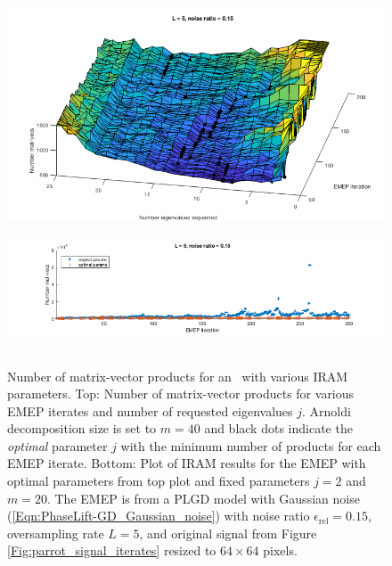 \begin{figure}[H]
\centering
\hbox{\hspace{-0.8cm} \includegraphics[scale=0.6]{Numerics-num_matvecs_orig_vs_optimal_params_1} }\vspace{1.0cm}
\hbox{\hspace{-1.6cm} \includegraphics[scale=0.6]{Numerics-num_matvecs_orig_vs_optimal_params_2} }\vspace{0.0cm}
	\caption{
Number of matrix-vector products for an \emep \ with various IRAM parameters.
Top: Number of matrix-vector products for various EMEP iterates and number of requested eigenvalues $j$.  Arnoldi decomposition size is set to $m = 40$ and black dots indicate the \textit{optimal} parameter $j$ with the minimum number of products for each EMEP iterate.
Bottom: Plot of IRAM results for the EMEP with optimal parameters from top plot and fixed parameters $j=2$ and $m=20$.
The EMEP is from a PLGD model with Gaussian noise	 (\ref{Eqn:PhaseLift-GD_Gaussian_noise}) with noise ratio $\epsilon_\text{rel} = 0.15$, oversampling rate $L = 5$, and original signal from Figure \ref{Fig:parrot_signal_iterates} resized to $64 \times 64$ pixels.
	}
\label{Fig:Numerics-num_matvecs_orig_vs_optimal_params}
\end{figure}


